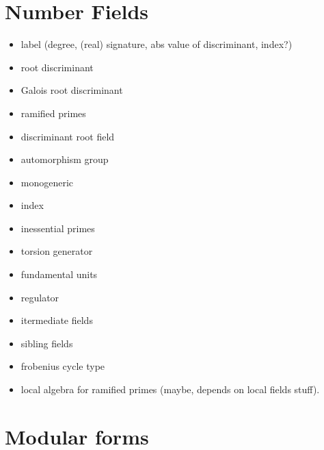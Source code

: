 %



\section{Number Fields}

\begin{itemize}
    \item label (degree, (real) signature, abs value of discriminant, index?)
    \item root discriminant
    \item Galois root discriminant
    \item ramified primes
    \item discriminant root field
    \item automorphism group
    \item monogeneric
    \item index
    \item inessential primes
    \item torsion generator
    \item fundamental units
    \item regulator
    \item itermediate fields
    \item sibling fields
    \item frobenius cycle type
    \item local algebra for ramified primes (maybe, depends on local fields stuff).
    \end{itemize}


\section{Modular forms}

